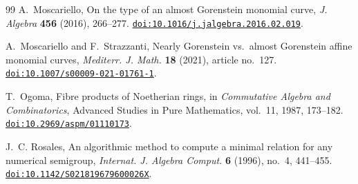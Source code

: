 \documentclass[10pt]{amsart}
\theoremstyle{plain}
\begin{document}
\begin{thebibliography}{99}
A.~Moscariello,
On the type of an almost Gorenstein monomial curve,
\emph{J. Algebra} \textbf{456} (2016), 266--277.
\href{https://doi.org/10.1016/j.jalgebra.2016.02.019}{\nolinkurl{doi:10.1016/j.jalgebra.2016.02.019}}.

A.~Moscariello and F.~Strazzanti,
Nearly Gorenstein vs.\ almost Gorenstein affine monomial curves,
\emph{Mediterr. J. Math.} \textbf{18} (2021), article no.~127.
\href{https://doi.org/10.1007/s00009-021-01761-1}{\nolinkurl{doi:10.1007/s00009-021-01761-1}}.

T.~Ogoma,
Fibre products of Noetherian rings,
in \emph{Commutative Algebra and Combinatorics},
Advanced Studies in Pure Mathematics, vol.~11, 1987, 173--182.
\href{https://doi.org/10.2969/aspm/01110173}{\nolinkurl{doi:10.2969/aspm/01110173}}.

J.~C. Rosales,
An algorithmic method to compute a minimal relation for any numerical
semigroup,
\emph{Internat. J. Algebra Comput.} \textbf{6} (1996), no.~4, 441--455.
\href{https://doi.org/10.1142/S021819679600026X}{\nolinkurl{doi:10.1142/S021819679600026X}}.

\end{thebibliography}
\end{document}
